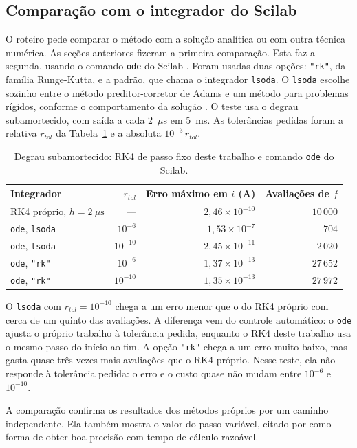 \subsection{Comparação com o integrador do Scilab}

O roteiro pede comparar o método com a solução analítica ou com outra técnica numérica. As seções anteriores fizeram a primeira comparação. Esta faz a segunda, usando o comando \texttt{ode} do Scilab \cite[seção~10.7]{aquino2020}. Foram usadas duas opções: \texttt{"rk"}, da família Runge-Kutta, e a padrão, que chama o integrador \texttt{lsoda}. O \texttt{lsoda} escolhe sozinho entre o método preditor-corretor de Adams e um método para problemas rígidos, conforme o comportamento da solução \cite[seção~10.7]{aquino2020}. O teste usa o degrau subamortecido, com saída a cada 2~\(\mu\)s em 5~ms. As tolerâncias pedidas foram a relativa \(r_{tol}\) da Tabela~\ref{tab:ode} e a absoluta \(10^{-3}\,r_{tol}\).

\begin{table}[htbp]
\centering
\caption{Degrau subamortecido: RK4 de passo fixo deste trabalho e comando \texttt{ode} do Scilab.}
\label{tab:ode}
\small
\begin{tabular}{@{}lrrr@{}}
\toprule
Integrador & \(r_{tol}\) & Erro máximo em \(i\) (A) & Avaliações de \(f\) \\
\midrule
RK4 próprio, \(h=2~\mu\mathrm{s}\) & --- & \(2{,}46\times 10^{-10}\) & \(10\,000\) \\
\texttt{ode}, \texttt{lsoda} & \(10^{-6}\) & \(1{,}53\times 10^{-7}\) & \(704\) \\
\texttt{ode}, \texttt{lsoda} & \(10^{-10}\) & \(2{,}45\times 10^{-11}\) & \(2\,020\) \\
\texttt{ode}, \texttt{"rk"} & \(10^{-6}\) & \(1{,}37\times 10^{-13}\) & \(27\,652\) \\
\texttt{ode}, \texttt{"rk"} & \(10^{-10}\) & \(1{,}35\times 10^{-13}\) & \(27\,972\) \\
\bottomrule
\end{tabular}
\end{table}

O \texttt{lsoda} com \(r_{tol}=10^{-10}\) chega a um erro menor que o do RK4 próprio com cerca de um quinto das avaliações. A diferença vem do controle automático: o \texttt{ode} ajusta o próprio trabalho à tolerância pedida, enquanto o RK4 deste trabalho usa o mesmo passo do início ao fim. A opção \texttt{"rk"} chega a um erro muito baixo, mas gasta quase três vezes mais avaliações que o RK4 próprio. Nesse teste, ela não responde à tolerância pedida: o erro e o custo quase não mudam entre \(10^{-6}\) e \(10^{-10}\).

A comparação confirma os resultados dos métodos próprios por um caminho independente. Ela também mostra o valor do passo variável, citado por \textcite[seção~10.6]{aquino2020} como forma de obter boa precisão com tempo de cálculo razoável.
